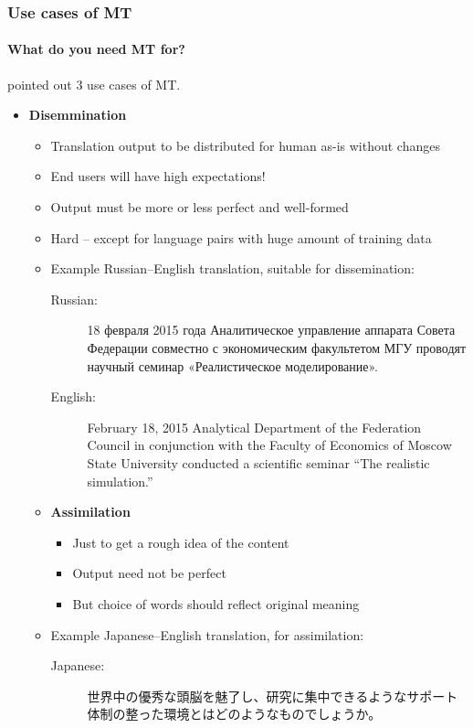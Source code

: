 \begin{frame}[allowframebreaks]
\frametitle{Use cases of MT}
\framesubtitle{What do you need MT for?}
\textcite[ch.~10]{Somers:2003} pointed out 3 use cases of MT.
\begin{itemize}
\item \textbf{Disemmination}
	\begin{itemize}
	\item Translation output to be distributed for human as-is without changes
	\item End users will have high expectations!
	\item Output must be more or less perfect and well-formed
	\item Hard -- except for language pairs with huge amount of training data
\framebreak
	\item Example Russian--English translation, suitable for dissemination:
		\begin{description}
		\item[Russian:] 18 февраля 2015 года Аналитическое управление аппарата Совета Федерации совместно с экономическим факультетом МГУ проводят научный семинар «Реалистическое моделирование».
		\item[English:] February 18, 2015 Analytical Department of the Federation Council in conjunction with the Faculty of Economics of Moscow State University conducted a scientific seminar ``The realistic simulation.''
		\end{description}
\framebreak
\item \textbf{Assimilation} 
	\begin{itemize}
	\item Just to get a rough idea of the content
	\item Output need not be perfect
	\item But choice of words should reflect original meaning
	 \end{itemize}
\framebreak
	\item Example Japanese--English translation, for assimilation:
		\begin{description}
		\item[Japanese:] 世界中の優秀な頭脳を魅了し、研究に集中できるようなサポート体制の整った環境とはどのようなものでしょうか。

\end{description}
\end{itemize}
\end{itemize}
\end{frame}
